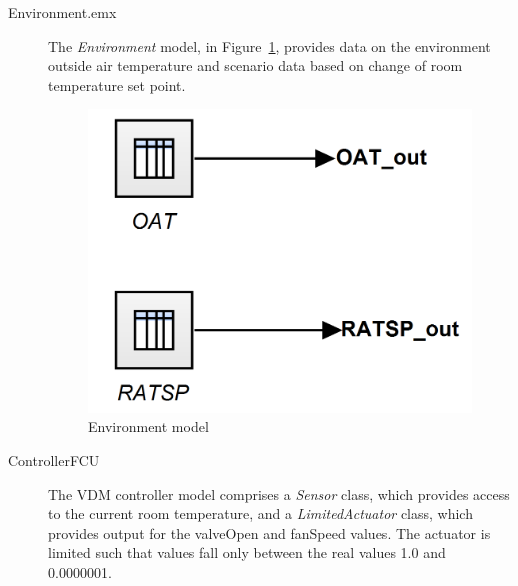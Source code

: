 \begin{description}
  \item[Environment.emx] The \emph{Environment} model, in Figure~\ref{fig:fcu_20-sim-RH_e}, provides data on the environment outside air temperature and scenario data based on change of room temperature set point.
  
\begin{figure}[htb!]
  \begin{center}
   \includegraphics[width=0.35\linewidth]{fcu/fcu_env} 
     \caption{Environment model}
     \label{fig:fcu_20-sim-RH_e}
  \end{center}
\end{figure}

  \item[ControllerFCU] The VDM controller model comprises a \emph{Sensor} class, which provides access to the current room temperature, and a \emph{LimitedActuator} class, which provides output for the valveOpen and fanSpeed values. The actuator is limited such that values fall only between the real values 1.0 and 0.0000001.
\end{description}

